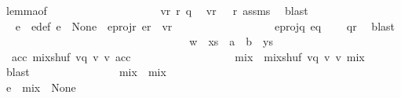\begin{isabellebody}
\ lemma{}{\isacharunderscore}{\kern0pt}{}{\isacharbrackleft}{\kern0pt}of\isanewline
\ \ \ \ \ \ \ \ \ \ \ \ \ \ \ \ \ \ \ \ vr\ r\ q{\isacharbrackright}{\kern0pt}\ \isamarkupfalse%
\ {\isacartoucheopen}vr\ {\isasymin}\ {\isasymL}\isactrlsup {\isacharasterisk}{\kern0pt}\ r{\isacartoucheclose}\ assms\ \isamarkupfalse%
\ blast\ \isanewline
\ \ \ \ \ \ \ \ \ \ \ \ \ \ \isamarkupfalse%
\ \isamarkupfalse%
\ e\ \ e{\isacharunderscore}{\kern0pt}def{\isacharcolon}{\kern0pt}\ {\isachardoublequoteopen}e\ {\isasymin}\ {\isasymT}\isactrlbsub None\isactrlesub {\isachardoublequoteclose}\ \ e{\isacharunderscore}{\kern0pt}proj{\isacharunderscore}{\kern0pt}r{\isacharcolon}{\kern0pt}\ {\isachardoublequoteopen}e{\isasymdown}\isactrlsub r\ {\isacharequal}{\kern0pt}\ vr{\isachardoublequoteclose}\ \isanewline
\ \ \ \ \ \ \ \ \ \ \ \ \ \ \ \ \ e{\isacharunderscore}{\kern0pt}proj{\isacharunderscore}{\kern0pt}q{\isacharcolon}{\kern0pt}\ {\isachardoublequoteopen}e{\isasymdown}\isactrlsub q\ {\isacharequal}{\kern0pt}\ {\isasymepsilon}{\isachardoublequoteclose}\ \isamarkupfalse%
\ qr\ \isamarkupfalse%
\ blast\isanewline
\ \ \ \ \ \ \ \ \ \ \ \ \ \ \ \ \ \ \isanewline
\ \ \ \ \ \ \ \ \ \ \ \ \ \ \isamarkupfalse%
\ {\isacharquery}{\kern0pt}w{\isacharprime}{\kern0pt}\ {\isacharequal}{\kern0pt}\ {\isachardoublequoteopen}xs\ {\isasymsqdot}\ a\ {\isacharhash}{\kern0pt}\ b\ {\isacharhash}{\kern0pt}\ ys{\isachardoublequoteclose}\isanewline
\ \ \ \ \ \ \ \ \ \ \ \ \ \ \isamarkupfalse%
\ {\isachardoublequoteopen}{\isasymexists}\ acc{\isachardot}{\kern0pt}\ mix{\isacharunderscore}{\kern0pt}shuf\ vq\ v\ v{\isacharprime}{\kern0pt}\ acc{\isachardoublequoteclose}\ \isamarkupfalse%
\isanewline
\ \ \ \ \ \ \ \ \ \ \ \ \ \ \isamarkupfalse%
\ \isamarkupfalse%
\ mix\ \ {\isachardoublequoteopen}mix{\isacharunderscore}{\kern0pt}shuf\ vq\ v\ v{\isacharprime}{\kern0pt}\ mix{\isachardoublequoteclose}\ \isamarkupfalse%
\ blast\isanewline
\ \ \ \ \ \ \ \ \ \ \ \ \ \ \isamarkupfalse%
\ {\isacharquery}{\kern0pt}mix\ {\isacharequal}{\kern0pt}\ {\isachardoublequoteopen}mix{\isachardoublequoteclose}\isanewline
\ \ \ \ \ \ \ \ \ \ \ \ \ \ \ \ \isanewline
\ \ \ \ \ \ \ \ \ \ \ \ \ \ \isamarkupfalse%
\ {\isachardoublequoteopen}e\ {\isasymsqdot}\ {\isacharquery}{\kern0pt}mix\ {\isasymin}\ {\isasymT}\isactrlbsub None\isactrlesub {\isachardoublequoteclose}\ \isamarkupfalse%

\end{isabellebody}
